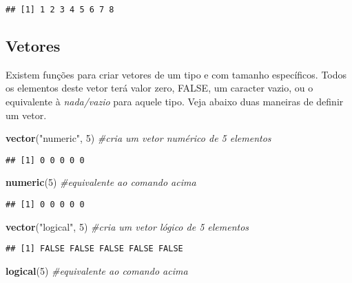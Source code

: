 \documentclass[]{book}
\newenvironment{Shaded}{\begin{snugshade}}{\end{snugshade}}
\newcommand{\CommentTok}[1]{\textcolor[rgb]{0.56,0.35,0.01}{\textit{#1}}}
\newcommand{\DecValTok}[1]{\textcolor[rgb]{0.00,0.00,0.81}{#1}}
\newcommand{\KeywordTok}[1]{\textcolor[rgb]{0.13,0.29,0.53}{\textbf{#1}}}
\newcommand{\NormalTok}[1]{#1}
\newcommand{\StringTok}[1]{\textcolor[rgb]{0.31,0.60,0.02}{#1}}
\theoremstyle{definition}
\theoremstyle{definition}
\theoremstyle{definition}
\theoremstyle{remark}
\begin{document}
\begin{verbatim}
## [1] 1 2 3 4 5 6 7 8
\end{verbatim}

\hypertarget{vetores}{%
\subsection{Vetores}\label{vetores}}

Existem funções para criar vetores de um tipo e com tamanho específicos.
Todos os elementos deste vetor terá valor zero, FALSE, um caracter vazio, ou o equivalente à \emph{nada/vazio} para aquele tipo.
Veja abaixo duas maneiras de definir um vetor.

\begin{Shaded}
\begin{Highlighting}[]
\KeywordTok{vector}\NormalTok{(}\StringTok{"numeric"}\NormalTok{, }\DecValTok{5}\NormalTok{) }\CommentTok{#cria um vetor numérico de 5 elementos}
\end{Highlighting}
\end{Shaded}

\begin{verbatim}
## [1] 0 0 0 0 0
\end{verbatim}

\begin{Shaded}
\begin{Highlighting}[]
\KeywordTok{numeric}\NormalTok{(}\DecValTok{5}\NormalTok{) }\CommentTok{#equivalente ao comando acima}
\end{Highlighting}
\end{Shaded}

\begin{verbatim}
## [1] 0 0 0 0 0
\end{verbatim}

\begin{Shaded}
\begin{Highlighting}[]
\KeywordTok{vector}\NormalTok{(}\StringTok{"logical"}\NormalTok{, }\DecValTok{5}\NormalTok{) }\CommentTok{#cria um vetor lógico de 5 elementos}
\end{Highlighting}
\end{Shaded}

\begin{verbatim}
## [1] FALSE FALSE FALSE FALSE FALSE
\end{verbatim}

\begin{Shaded}
\begin{Highlighting}[]
\KeywordTok{logical}\NormalTok{(}\DecValTok{5}\NormalTok{) }\CommentTok{#equivalente ao comando acima}
\end{Highlighting}
\end{Shaded}
\end{document}
